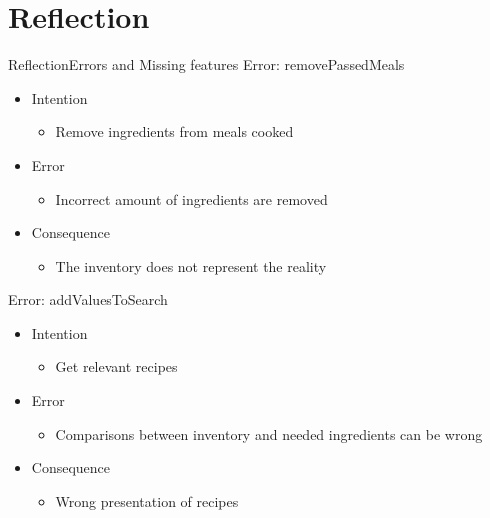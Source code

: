 \section{Reflection}

\begin{frame}{Reflection}{Errors and Missing features}%
	Error: removePassedMeals 
	\begin{itemize}
		\item Intention
			\begin{itemize}
			\item Remove ingredients from meals cooked
			\end{itemize}
		\item Error
			\begin{itemize}
			\item Incorrect amount of ingredients are removed
			\end{itemize}
		\item Consequence
			\begin{itemize}
			\item The inventory does not represent the reality
			\end{itemize}
	\end{itemize}
	
		Error: addValuesToSearch
		\begin{itemize}
			\item Intention
				\begin{itemize}
				\item Get relevant recipes
				\end{itemize}
			\item Error
				\begin{itemize}
				\item Comparisons between inventory and needed ingredients can be wrong 
				\end{itemize}
			\item Consequence
				\begin{itemize}
				\item Wrong presentation of recipes
				\end{itemize}
		\end{itemize}
\end{frame}

